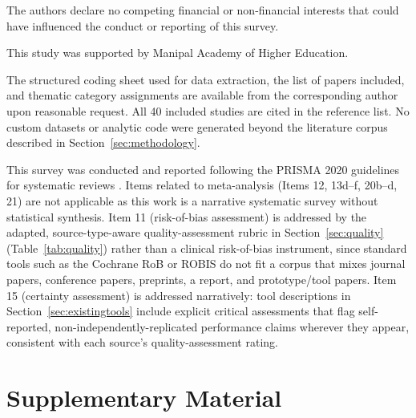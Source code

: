 \documentclass[sn-basic,Numbered]{sn-jnl}
\begin{document}
\backmatter


The authors declare no competing financial or non-financial interests
that could have influenced the conduct or reporting of this survey.


This study was supported by Manipal Academy of Higher Education. 


The structured coding sheet used for data extraction, the list of
papers included, and thematic category assignments are available from
the corresponding author upon reasonable request. All 40 included
studies are cited in the reference list. No custom datasets or analytic
code were generated beyond the literature corpus described in
Section~\ref{sec:methodology}.


This survey was conducted and reported following the PRISMA 2020
guidelines for systematic reviews \cite{page2021prisma}. Items related
to meta-analysis (Items 12, 13d--f, 20b--d, 21) are not applicable as
this work is a narrative systematic survey without statistical
synthesis. Item 11 (risk-of-bias assessment) is addressed by the
adapted, source-type-aware quality-assessment rubric in
Section~\ref{sec:quality} (Table~\ref{tab:quality}) rather than a
clinical risk-of-bias instrument, since standard tools such as the
Cochrane RoB or ROBIS do not fit a corpus that mixes journal papers,
conference papers, preprints, a report, and prototype/tool papers.
Item 15 (certainty assessment) is addressed narratively: tool
descriptions in Section~\ref{sec:existingtools} include explicit
critical assessments that flag self-reported, non-independently-replicated
performance claims wherever they appear, consistent with each source's
quality-assessment rating.

\section{Supplementary Material}
\label{sec:supplementary}
\end{document}
